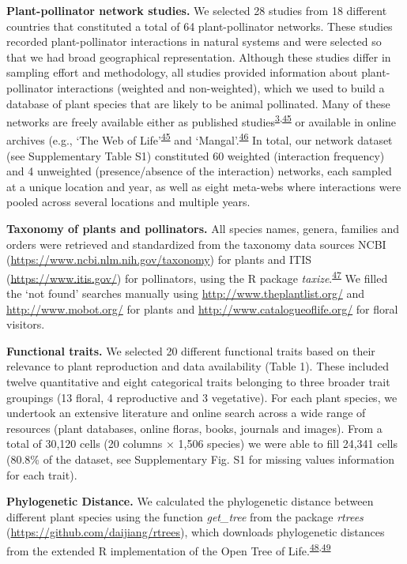 \documentclass[
  12pt,
  a4paper,
]{article}
\begin{document}
\textbf{Plant-pollinator network studies.} We selected 28 studies from 18 different countries that constituted a total of 64 plant-pollinator networks. These studies recorded plant-pollinator interactions in natural systems and were selected so that we had broad geographical representation. Although these studies differ in sampling effort and methodology, all studies provided information about plant-pollinator interactions (weighted and non-weighted), which we used to build a database of plant species that are likely to be animal pollinated. Many of these networks are freely available either as published studies\textsuperscript{\protect\hyperlink{ref-carvalheiro2014}{3},\protect\hyperlink{ref-fortuna2010}{45}} or available in online archives (e.g., `The Web of Life'\textsuperscript{\protect\hyperlink{ref-fortuna2010}{45}} and `Mangal'.\textsuperscript{\protect\hyperlink{ref-poisot2016}{46}} In total, our network dataset (see Supplementary Table S1) constituted 60 weighted (interaction frequency) and 4 unweighted (presence/absence of the interaction) networks, each sampled at a unique location and year, as well as eight meta-webs where interactions were pooled across several locations and multiple years.

\textbf{Taxonomy of plants and pollinators.} All species names, genera, families and orders were retrieved and standardized from the taxonomy data sources NCBI (\url{https://www.ncbi.nlm.nih.gov/taxonomy}) for plants and ITIS (\url{https://www.itis.gov/}) for pollinators, using the R package \emph{taxize}.\textsuperscript{\protect\hyperlink{ref-chamberlain2020}{47}} We filled the `not found' searches manually using \url{http://www.theplantlist.org/} and \url{http://www.mobot.org/} for plants and \url{http://www.catalogueoflife.org/} for floral visitors.

\textbf{Functional traits.} We selected 20 different functional traits based on their relevance to plant reproduction and data availability (Table 1). These included twelve quantitative and eight categorical traits belonging to three broader trait groupings (13 floral, 4 reproductive and 3 vegetative). For each plant species, we undertook an extensive literature and online search across a wide range of resources (plant databases, online floras, books, journals and images). From a total of 30,120 cells (20 columns × 1,506 species) we were able to fill 24,341 cells (80.8\% of the dataset, see Supplementary Fig. S1 for missing values information for each trait).

\textbf{Phylogenetic Distance.} We calculated the phylogenetic distance between different plant species using the function \emph{get\_tree} from the package \emph{rtrees} (\url{https://github.com/daijiang/rtrees}), which downloads phylogenetic distances from the extended R implementation of the Open Tree of Life.\textsuperscript{\protect\hyperlink{ref-smith2018}{48},\protect\hyperlink{ref-jin2019}{49}}
\end{document}
